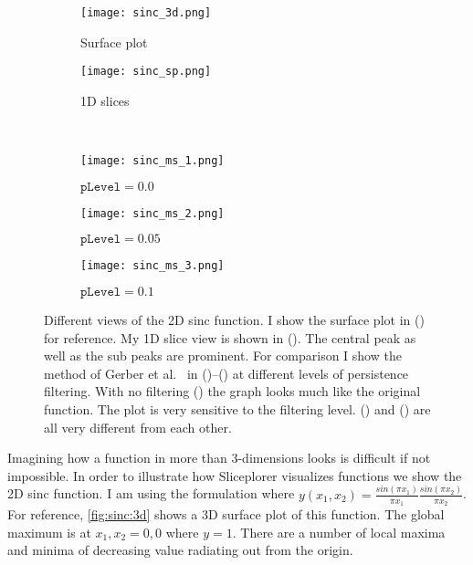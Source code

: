 \begin{figure}
  \centering
  \begin{subfigure}[b]{0.3\linewidth}
    \texttt{[image: sinc\_3d.png]}
    \caption{
      Surface plot
    }
    \label{fig:sinc:3d}
  \end{subfigure}
  \qquad\qquad%
  \begin{subfigure}[b]{0.3\linewidth}
    \texttt{[image: sinc\_sp.png]}
    \caption{
      1D slices
    }
    \label{fig:sinc:sp}
  \end{subfigure}
  \\
  \begin{subfigure}[b]{0.3\linewidth}
    \texttt{[image: sinc\_ms\_1.png]}
    \caption{
      $\texttt{pLevel} = 0.0$
    }
    \label{fig:sinc:ms_1}
  \end{subfigure}
  \hfill
  \begin{subfigure}[b]{0.3\linewidth}
    \texttt{[image: sinc\_ms\_2.png]}
    \caption{
      $\texttt{pLevel} = 0.05$
    }
    \label{fig:sinc:ms_2}
  \end{subfigure}
  \hfill
  \begin{subfigure}[b]{0.3\linewidth}
    \texttt{[image: sinc\_ms\_3.png]}
    \caption{
      $\texttt{pLevel} = 0.1$
    }
    \label{fig:sinc:ms_3}
  \end{subfigure}
  \caption{
    Different views of the 2D sinc function. I show the surface plot
    in () for reference. My 1D slice view is shown
    in (). The central peak as well as the sub peaks
    are prominent. For comparison I show the method of Gerber et 
    al.~\cite{Gerber:2010} in 
    ()--() at different levels 
    of persistence filtering. 
    With no filtering () the graph looks much like the
    original function. The plot is very sensitive to the filtering level.
    () and () are all very 
    different from each other.
  }
  \label{fig:sinc}
\end{figure}

Imagining how a function in more than 3-dimensions looks is difficult if not
impossible. In order to illustrate how Sliceplorer visualizes functions we show
the 2D sinc function. 
I am using the formulation where 
$y(x_1,x_2) = \frac{sin(\pi x_1)}{\pi x_1} \frac{sin(\pi x_2)}{\pi x_2}$.
For reference, \autoref{fig:sinc:3d} shows a 3D surface plot of this function. The 
global maximum is at $x_1,x_2 = 0,0$ where $y=1$. There are a number of local
maxima and minima of decreasing value radiating out from the origin.

